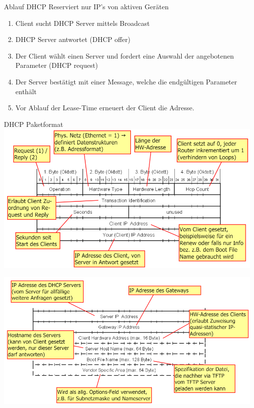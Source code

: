 \begin{KR}{Ablauf DHCP} Reserviert nur IP’s von aktiven Geräten
    \begin{enumerate}
        \item Client sucht DHCP Server mittels Broadcast
        \item DHCP Server antwortet (DHCP offer)
        \item Der Client wählt einen Server und fordert eine Auswahl der angebotenen Parameter (DHCP request)
        \item Der Server bestätigt mit einer Message, welche die endgültigen Parameter enthält
        \item Vor Ablauf der Lease-Time erneuert der Client die Adresse.
    \end{enumerate}
\end{KR}

\begin{definition}{DHCP Paketformat}\\
    \includegraphics[width=1\linewidth]{images/dhcp_format1.png}

    \vspace{2mm}

    \includegraphics[width=1\linewidth]{images/dhcp_format2.png}
\end{definition}

